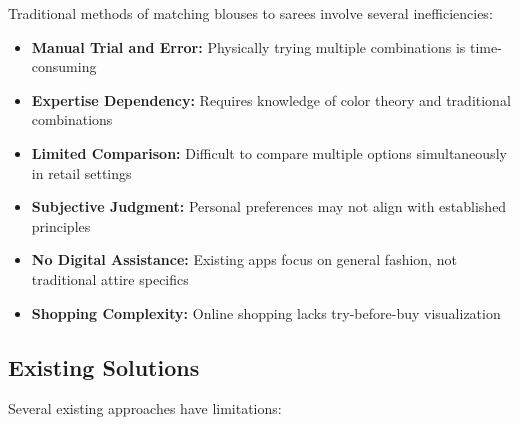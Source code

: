 \documentclass[12pt,a4paper]{report}
\begin{document}
Traditional methods of matching blouses to sarees involve several inefficiencies:

\begin{itemize}
    \item \textbf{Manual Trial and Error:} Physically trying multiple combinations is time-consuming
    \item \textbf{Expertise Dependency:} Requires knowledge of color theory and traditional combinations
    \item \textbf{Limited Comparison:} Difficult to compare multiple options simultaneously in retail settings
    \item \textbf{Subjective Judgment:} Personal preferences may not align with established principles
    \item \textbf{No Digital Assistance:} Existing apps focus on general fashion, not traditional attire specifics
    \item \textbf{Shopping Complexity:} Online shopping lacks try-before-buy visualization
\end{itemize}

\subsection{Existing Solutions}

Several existing approaches have limitations:
\end{document}
